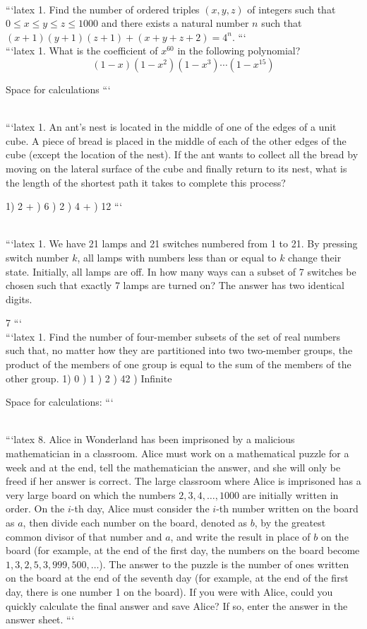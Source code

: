 \\
```latex
1. Find the number of ordered triples $(x, y, z)$ of integers such that $0 \leq x \leq y \leq z \leq 1000$ and there exists a natural number $n$ such that $(x+1)(y+1)(z+1) + (x+y+z+2) = 4^n$.
```
\\
```latex
1. What is the coefficient of $x^{60}$ in the following polynomial?  
$$(1-x)(1-x^2)(1-x^3)\cdots(1-x^{15})$$

Space for calculations
```

\\
```latex
1. An ant's nest is located in the middle of one of the edges of a unit cube. A piece of bread is placed in the middle of each of the other edges of the cube (except the location of the nest). If the ant wants to collect all the bread by moving on the lateral surface of the cube and finally return to its nest, what is the length of the shortest path it takes to complete this process?

1) 2 +  ) 6 ) 2 ) 4 +  ) 12
```

\\
```latex
1. We have 21 lamps and 21 switches numbered from 1 to 21. By pressing switch number $k$, all lamps with numbers less than or equal to $k$ change their state. Initially, all lamps are off. In how many ways can a subset of 7 switches be chosen such that exactly 7 lamps are turned on? The answer has two identical digits.

7
```
\\
```latex
1. Find the number of four-member subsets of the set of real numbers such that, no matter how they are partitioned into two two-member groups, the product of the members of one group is equal to the sum of the members of the other group. 
1) 0 ) 1 ) 2 ) 42 ) Infinite

Space for calculations:
```

\\
```latex
8. Alice in Wonderland has been imprisoned by a malicious mathematician in a classroom. Alice must work on a mathematical puzzle for a week and at the end, tell the mathematician the answer, and she will only be freed if her answer is correct. The large classroom where Alice is imprisoned has a very large board on which the numbers $2, 3, 4, \ldots, 1000$ are initially written in order. On the $i$-th day, Alice must consider the $i$-th number written on the board as $a$, then divide each number on the board, denoted as $b$, by the greatest common divisor of that number and $a$, and write the result in place of $b$ on the board (for example, at the end of the first day, the numbers on the board become $1, 3, 2, 5, 3, 999, 500, \ldots$). The answer to the puzzle is the number of ones written on the board at the end of the seventh day (for example, at the end of the first day, there is one number 1 on the board). If you were with Alice, could you quickly calculate the final answer and save Alice? If so, enter the answer in the answer sheet.
```

